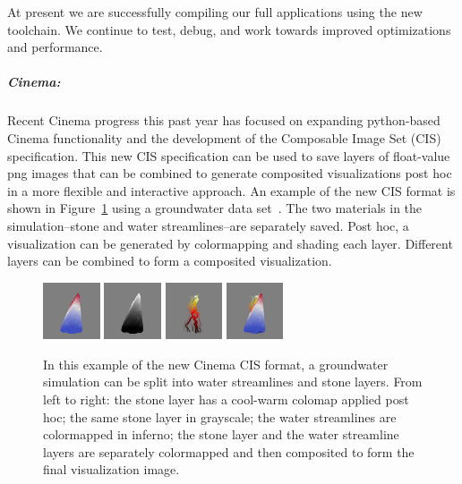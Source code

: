 At present we are successfully compiling our full applications using the new
toolchain.  We continue to test, debug, and work towards improved optimizations
and performance. 

\subparagraph{Cinema:}

Recent Cinema progress this past year has focused on expanding python-based Cinema functionality and the development of the Composable Image Set (CIS) specification. This new CIS specification can be used to save layers of float-value png images that can be combined to generate composited visualizations post hoc in a more flexible and interactive approach.  An example of the new CIS format is shown in Figure~\ref{fig:cinema-cis} using a groundwater data set~\cite{cis:garcia:limestone}.  The two materials in the simulation--stone and water streamlines--are separately saved.  Post hoc, a visualization can be generated by colormapping and shading each layer.  Different layers can be combined to form a composited visualization.


\begin{figure}[htb]
	\centering
	\includegraphics[width=0.15\textwidth]{projects/2.3.6-NNSA/2.3.6.01-LANL-ATDM/cinema-cis-stone-coolwarm.png}
	\includegraphics[width=0.15\textwidth]{projects/2.3.6-NNSA/2.3.6.01-LANL-ATDM/cinema-cis-stone-grayscale.png}
	\includegraphics[width=0.15\textwidth]{projects/2.3.6-NNSA/2.3.6.01-LANL-ATDM/cinema-cis-streamlines.png}
	\includegraphics[width=0.15\textwidth]{projects/2.3.6-NNSA/2.3.6.01-LANL-ATDM/cinema-cis-stone-water.png}
	\caption{
		In this example of the new Cinema CIS format, a groundwater simulation can be split into water streamlines and stone layers.  From left to right: the stone layer has a cool-warm colomap applied post hoc; the same stone layer in grayscale;  the water streamlines are colormapped in inferno;  the stone layer and the water streamline layers are separately colormapped and then composited to form the final visualization image.  
		\label{fig:cinema-cis}
	}
\end{figure}

